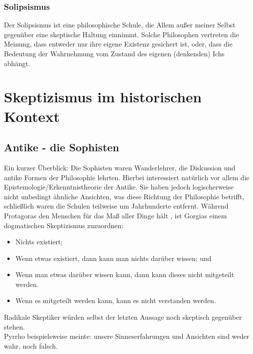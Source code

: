 \documentclass[11pt,a4paper]{article}
\begin{document}
		\subsubsection{Solipsismus}
Der Solipsismus ist eine philosophische Schule, die Allem außer meiner Selbst gegenüber eine skeptische Haltung einnimmt. Solche Philosophen vertreten die Meinung, dass entweder nur ihre eigene Existenz gesichert ist, oder, dass die Bedeutung der Wahrnehmung vom Zustand des eigenen (denkenden) Ichs abhängt.%
\section{Skeptizismus im historischen Kontext}
	\subsection{Antike - die Sophisten}
Ein kurzer Überblick: Die Sophisten waren Wanderlehrer, die Diskussion und antike Formen der Philosophie lehrten. Hierbei interessiert natürlich vor allem die Epistemologie/Erkenntnistheorie der Antike. Sie haben jedoch logischerweise nicht unbedingt ähnliche Ansichten, was diese Richtung der Philosophie betrifft, schließlich waren die Schulen teilweise um Jahrhunderte entfernt. Während Protagoras den Menschen für das Maß aller Dinge hält%
, ist Gorgias einem dogmatischen Skeptizismus zuzuordnen:
\begin{itemize}
\item Nichts existiert;
\item Wenn etwas existiert, dann kann man nichts darüber wissen; und
\item Wenn man etwas darüber wissen kann, dann kann dieses nicht mitgeteilt werden.
\item Wenn es mitgeteilt werden kann, kann es nicht verstanden werden.
\end{itemize}%
Radikale Skeptiker würden selbst der letzten Aussage noch skeptisch gegenüber stehen.\\
Pyrrho beispielsweise meinte: \glqq unsere Sinneserfahrungen und Ansichten sind weder wahr, noch falsch\grqq.%
\end{document}
